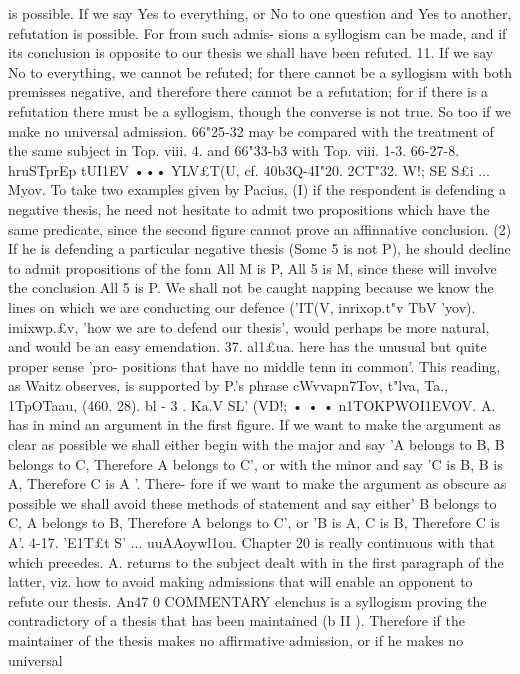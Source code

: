 {{{{{{is possible. If we say Yes to everything, or No to one question
and Yes to another, refutation is possible. For from such admis-
sions a syllogism can be made, and if its conclusion is opposite to
our thesis we shall have been refuted.
11. If we say No to everything, we cannot be refuted; for there
cannot be a syllogism with both premisses negative, and therefore
there cannot be a refutation; for if there is a refutation there must
be a syllogism, though the converse is not true. So too if we make
no universal admission.
66"25-32 may be compared with the treatment of the same
subject in Top. viii. 4. and 66"33-b3 with Top. viii. 1-3.
66-27-8. hruSTprEp tUI1EV ••• YLV£T(U, cf. 40b3Q-4I"20.
2CT"32. W!; SE S£i ... Myov. To take two examples given by
Pacius, (I) if the respondent is defending a negative thesis, he need
not hesitate to admit two propositions which have the same
predicate, since the second figure cannot prove an affinnative
conclusion. (2) If he is defending a particular negative thesis
(Some 5 is not P), he should decline to admit propositions of the
fonn All M is P, All 5 is M, since these will involve the conclusion
All 5 is P. We shall not be caught napping because we know
the lines on which we are conducting our defence ('IT(V, inrixop.t"v
TbV '\6yov). imixwp.£v, 'how we are to defend our thesis', would
perhaps be more natural, and would be an easy emendation.
37. al1£ua. here has the unusual but quite proper sense 'pro-
positions that have no middle tenn in common'. This reading,
as Waitz observes, is supported by P.'s phrase cWvvapn7Tov, t"lva,
Ta., 1TpOTaau, (460.
28).
bl - 3 . Ka.V SL' (VD!; • • • n1TOKPWOI1EVOV.
A. has in mind an
argument in the first figure. If we want to make the argument
as clear as possible we shall either begin with the major and say
'A belongs to B, B belongs to C, Therefore A belongs to C', or
with the minor and say 'C is B, B is A, Therefore C is A '. There-
fore if we want to make the argument as obscure as possible we
shall avoid these methods of statement and say either' B belongs
to C, A belongs to B, Therefore A belongs to C', or 'B is A,
C is B, Therefore C is A'.
4-17. 'E1T£t S' ... uuAAoywl1ou. Chapter 20 is really continuous
with that which precedes. A. returns to the subject dealt with
in the first paragraph of the latter, viz. how to avoid making
admissions that will enable an opponent to refute our thesis. An47 0
COMMENTARY
elenchus is a syllogism proving the contradictory of a thesis that
has been maintained (b II ). Therefore if the maintainer of the
thesis makes no affirmative admission, or if he makes no universal
}}}}}}

